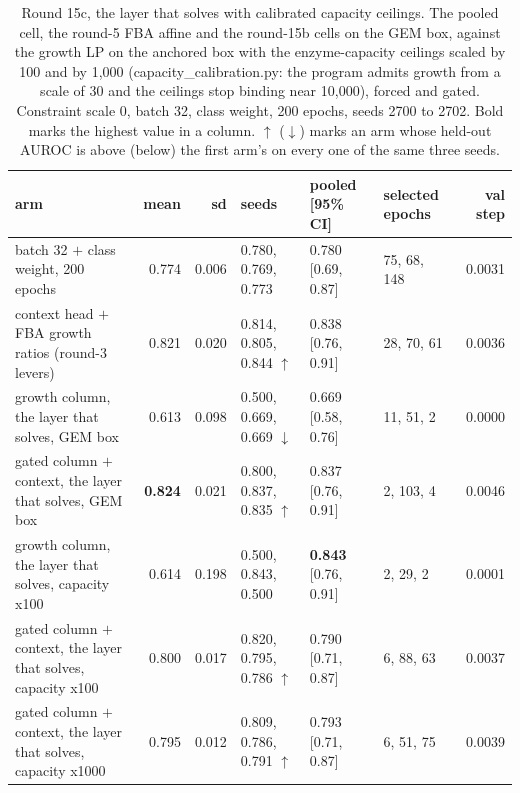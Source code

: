 \begin{table}[H]
  \centering
  \scriptsize
  \setlength{\tabcolsep}{3pt}
  \caption[Round 15c, the layer that solves with calibrated capacity ceilings]{Round 15c, the layer that solves with calibrated capacity ceilings. The pooled cell, the round-5 FBA affine and the round-15b cells on the GEM box, against the growth LP on the anchored box with the enzyme-capacity ceilings scaled by 100 and by 1,000 (capacity\_calibration.py: the program admits growth from a scale of 30 and the ceilings stop binding near 10,000), forced and gated. Constraint scale 0, batch 32, class weight, 200 epochs, seeds 2700 to 2702. Bold marks the highest value in a column. $\uparrow$ ($\downarrow$) marks an arm whose held-out AUROC is above (below) the first arm's on every one of the same three seeds.}
  \label{tab:w30}
  \begin{tabular}{@{}lrrlllr@{}}
    \hline
    arm & mean & sd & seeds & pooled [95\% CI] & selected epochs & val step \\
    \hline
    batch 32 $+$ class weight, 200 epochs & 0.774 & 0.006 & 0.780, 0.769, 0.773 & 0.780 [0.69, 0.87] & 75, 68, 148 & 0.0031 \\
    context head $+$ FBA growth ratios (round-3 levers) & 0.821 & 0.020 & 0.814, 0.805, 0.844 $\uparrow$ & 0.838 [0.76, 0.91] & 28, 70, 61 & 0.0036 \\
    growth column, the layer that solves, GEM box & 0.613 & 0.098 & 0.500, 0.669, 0.669 $\downarrow$ & 0.669 [0.58, 0.76] & 11, 51, 2 & 0.0000 \\
    gated column $+$ context, the layer that solves, GEM box & \textbf{0.824} & 0.021 & 0.800, 0.837, 0.835 $\uparrow$ & 0.837 [0.76, 0.91] & 2, 103, 4 & 0.0046 \\
    growth column, the layer that solves, capacity x100 & 0.614 & 0.198 & 0.500, 0.843, 0.500 & \textbf{0.843} [0.76, 0.91] & 2, 29, 2 & 0.0001 \\
    gated column $+$ context, the layer that solves, capacity x100 & 0.800 & 0.017 & 0.820, 0.795, 0.786 $\uparrow$ & 0.790 [0.71, 0.87] & 6, 88, 63 & 0.0037 \\
    gated column $+$ context, the layer that solves, capacity x1000 & 0.795 & 0.012 & 0.809, 0.786, 0.791 $\uparrow$ & 0.793 [0.71, 0.87] & 6, 51, 75 & 0.0039 \\
    \hline
  \end{tabular}
\end{table}

